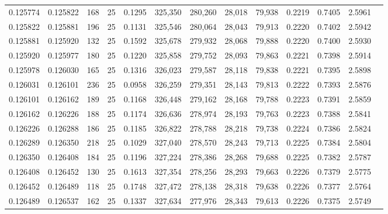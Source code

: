 \begin{tabular}{rrrrrrrrrrrrr}
0.125774 & 0.125822 &   168 &  25 &                                     0.1295 & 325,350 & 280,260 &  28,018 &  79,938 & 0.2219 & 0.7405 & 2.5961 \\
0.125822 & 0.125881 &   196 &  25 &                                     0.1131 & 325,546 & 280,064 &  28,043 &  79,913 & 0.2220 & 0.7402 & 2.5942 \\
0.125881 & 0.125920 &   132 &  25 &                                     0.1592 & 325,678 & 279,932 &  28,068 &  79,888 & 0.2220 & 0.7400 & 2.5930 \\
0.125920 & 0.125977 &   180 &  25 &                                     0.1220 & 325,858 & 279,752 &  28,093 &  79,863 & 0.2221 & 0.7398 & 2.5914 \\
0.125978 & 0.126030 &   165 &  25 &                                     0.1316 & 326,023 & 279,587 &  28,118 &  79,838 & 0.2221 & 0.7395 & 2.5898 \\
0.126031 & 0.126101 &   236 &  25 &                                     0.0958 & 326,259 & 279,351 &  28,143 &  79,813 & 0.2222 & 0.7393 & 2.5876 \\
0.126101 & 0.126162 &   189 &  25 &                                     0.1168 & 326,448 & 279,162 &  28,168 &  79,788 & 0.2223 & 0.7391 & 2.5859 \\
0.126162 & 0.126226 &   188 &  25 &                                     0.1174 & 326,636 & 278,974 &  28,193 &  79,763 & 0.2223 & 0.7388 & 2.5841 \\
0.126226 & 0.126288 &   186 &  25 &                                     0.1185 & 326,822 & 278,788 &  28,218 &  79,738 & 0.2224 & 0.7386 & 2.5824 \\
0.126289 & 0.126350 &   218 &  25 &                                     0.1029 & 327,040 & 278,570 &  28,243 &  79,713 & 0.2225 & 0.7384 & 2.5804 \\
0.126350 & 0.126408 &   184 &  25 &                                     0.1196 & 327,224 & 278,386 &  28,268 &  79,688 & 0.2225 & 0.7382 & 2.5787 \\
0.126408 & 0.126452 &   130 &  25 &                                     0.1613 & 327,354 & 278,256 &  28,293 &  79,663 & 0.2226 & 0.7379 & 2.5775 \\
0.126452 & 0.126489 &   118 &  25 &                                     0.1748 & 327,472 & 278,138 &  28,318 &  79,638 & 0.2226 & 0.7377 & 2.5764 \\
0.126489 & 0.126537 &   162 &  25 &                                     0.1337 & 327,634 & 277,976 &  28,343 &  79,613 & 0.2226 & 0.7375 & 2.5749 \\

\end{tabular}
